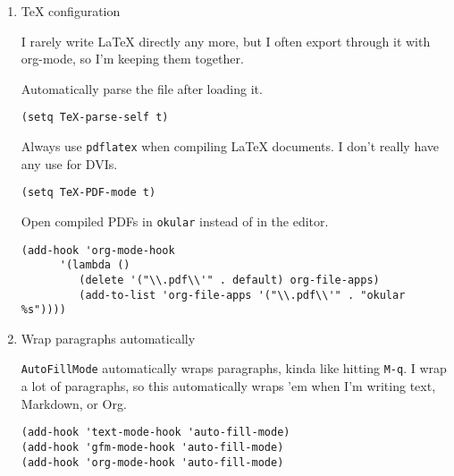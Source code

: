 \documentclass{article}
\begin{document}
\begin{enumerate}
\begin{enumerate}
Include the \texttt{minted} package in all of my \LaTeX{} exports.

\begin{verbatim}
(add-to-list 'org-latex-packages-alist '("" "minted"))
(setq org-latex-listings 'minted)
\end{verbatim}
\end{enumerate}



\item \TeX{} configuration
\label{sec:orgabeeded}

I rarely write \LaTeX{} directly any more, but I often export through it with
org-mode, so I'm keeping them together.

Automatically parse the file after loading it.

\begin{verbatim}
(setq TeX-parse-self t)
\end{verbatim}

Always use \texttt{pdflatex} when compiling \LaTeX{} documents. I don't really have any
use for DVIs.

\begin{verbatim}
(setq TeX-PDF-mode t)
\end{verbatim}

Open compiled PDFs in \texttt{okular} instead of in the editor.

\begin{verbatim}
(add-hook 'org-mode-hook
	  '(lambda ()
		 (delete '("\\.pdf\\'" . default) org-file-apps)
		 (add-to-list 'org-file-apps '("\\.pdf\\'" . "okular %s"))))
\end{verbatim}




\item Wrap paragraphs automatically
\label{sec:org0d03931}

\texttt{AutoFillMode} automatically wraps paragraphs, kinda like hitting \texttt{M-q}. I wrap
a lot of paragraphs, so this automatically wraps 'em when I'm writing text,
Markdown, or Org.

\begin{verbatim}
(add-hook 'text-mode-hook 'auto-fill-mode)
(add-hook 'gfm-mode-hook 'auto-fill-mode)
(add-hook 'org-mode-hook 'auto-fill-mode)
\end{verbatim}
\end{enumerate}
\end{document}
